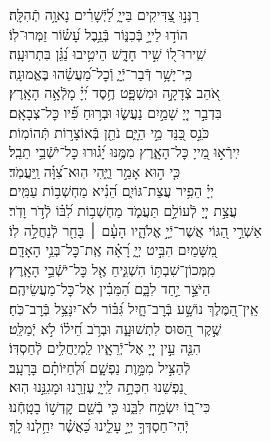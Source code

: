 \documentclass[twoside, openany, parskip=half, 11pt]{book}
\begin{document}
\begin{narrow}
רַנְּנ֣וּ צַ֭דִּיקִים בַּייָ֑ \hfill
לַ֝יְֿשָׁרִ֗ים נָאוָ֥ה תְֿהִלָּֽה׃ \\
הוֹד֣וּ לַייָ֣ בְּֿכִנּ֑וֹר \hfill בְּֿנֵ֥בֶל עָ֝שׂ֗וֹר זַמְּרוּ־לֽוֹ׃ \\
שִֽׁירוּ־ל֭וֹ שִׁ֣יר חָדָ֑שׁ \hfill הֵיטִ֥יבוּ נַ֝גֵּ֗ן בִּתְרוּעָֽה׃ \\
כִּֽי־יָשָׁ֥ר דְּֿבַר־יְֿיָ֑ \hfill וְֿכׇל־מַ֝עֲשֵׂ֗הוּ בֶּאֱמוּנָֽה׃ \\
אֹ֭הֵב צְֿדָקָ֣ה וּמִשְׁפָּ֑ט \hfill חֶ֥סֶד יְ֝יָ֗ מָלְֿאָ֥ה הָאָֽרֶץ׃ \\
בִּדְבַ֣ר יְיָ֭ שָׁמַ֣יִם נַעֲשׂ֑וּ \hfill וּבְר֥וּחַ פִּ֗֝יו כׇּל־צְבָאָֽם׃ \\
כֹּנֵ֣ס כַּ֭נֵּד מֵ֣י הַיָּ֑ם \hfill נֹתֵ֖ן בְּֿאוֹצָר֣וֹת תְּֿהוֹמֽוֹת׃ \\
יִֽירְֿא֣וּ מֵ֭ייָ כׇּל־הָאָ֑רֶץ \hfill מִמֶּ֥נּוּ יָ֝ג֗וּרוּ כׇּל־יֹשְֿׁבֵ֥י תֵבֵֽל׃ \\
כִּ֤י ה֣וּא אָמַ֣ר וַיֶּ֑הִי \hfill הֽוּא־צִ֝וָּ֗ה וַֽיַּעֲמֹֽד׃ \\
יְיָ֗ הֵפִ֥יר עֲצַת־גּוֹיִ֑ם \hfill הֵ֝נִ֗יא מַחְשְׁב֥וֹת עַמִּֽים׃ \\
עֲצַ֣ת יְיָ֭ לְֿעוֹלָ֣ם תַּעֲמֹ֑ד \hfill מַחְשְׁב֥וֹת לִ֝בּ֗וֹ לְֿדֹ֣ר וָדֹֽר׃ \\
אַשְׁרֵ֣י הַ֭גּוֹי אֲשֶׁר־יְֿיָ֣ אֱלֹהָ֑יו \hfill הָעָ֓ם ׀ בָּחַ֖ר לְֿנַחֲלָ֣ה לֽוֹ׃ \\
מִ֭שָּׁמַיִם הִבִּ֣יט יְיָ֑ \hfill רָ֝אָ֗ה אֶֽת־כׇּל־בְּנֵ֥י הָאָדָֽם׃ \\
מִֽמְּכוֹן־שִׁבְתּ֥וֹ הִשְׁגִּ֑יחַ \hfill אֶ֖ל כׇּל־יֹשְֿׁבֵ֣י הָאָֽרֶץ׃ \\
הַיֹּצֵ֣ר יַ֣חַד לִבָּ֑ם \hfill הַ֝מֵּבִ֗ין אֶל־כׇּל־מַעֲשֵׂיהֶֽם׃ \\
אֵֽין־הַ֭מֶּלֶךְ נוֹשָׁ֣ע בְּֿרׇב־חָ֑יִל \hfill גִּ֝בּ֗וֹר לֹא־יִנָּצֵ֥ל בְּֿרׇב־כֹּֽחַ׃ \\
שֶׁ֣קֶר הַ֭סּוּס לִתְשׁוּעָ֑ה \hfill וּבְרֹ֥ב חֵ֝יל֗וֹ לֹ֣א יְֿמַלֵּֽט׃ \\
הִנֵּ֤ה עֵ֣ין יְיָ֭ אֶל־יְֿרֵאָ֑יו \hfill לַֽמְיַחֲלִ֥ים לְֿחַסְדּֽוֹ׃ \\
לְֿהַצִּ֣יל מִמָּ֣וֶת נַפְשָׁ֑ם \hfill וּ֝לְחַיּוֹתָ֗ם בָּרָעָֽב׃ \\
נַ֭פְשֵׁנוּ חִכְּתָ֣ה לַֽייָ֑ \hfill עֶזְרֵ֖נוּ וּמָגִנֵּ֣נוּ הֽוּא׃ \\
כִּי־ב֭וֹ יִשְׂמַ֣ח לִבֵּ֑נוּ \hfill כִּ֤י בְֿשֵׁ֖ם קׇדְשׁ֣וֹ בָטָֽחְֿנוּ׃ \\
יְֿהִי־חַסְדְּךָ֣ יְיָ֣ עָלֵ֑ינוּ \hfill כַּ֝אֲשֶׁ֗ר יִחַ֥לְנוּ לָֽךְ׃ \\



\end{narrow}
\end{document}
